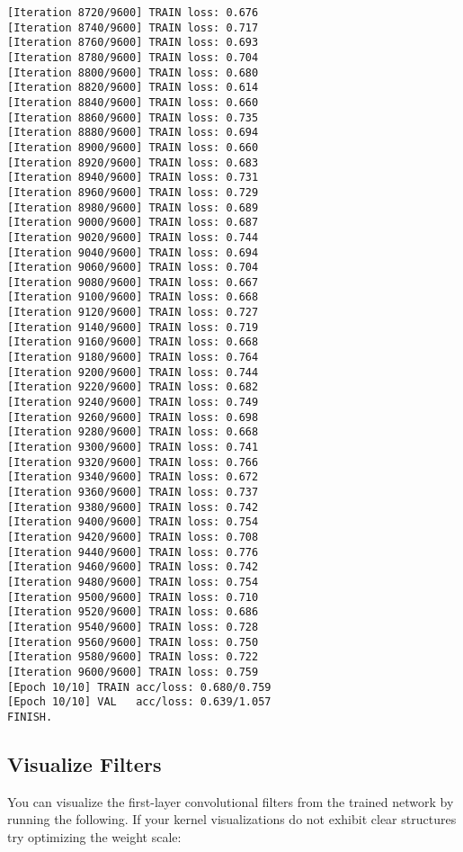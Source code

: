 \documentclass[11pt]{article}
\begin{document}
\begin{Verbatim}[commandchars=\\\{\}]
[Iteration 8720/9600] TRAIN loss: 0.676
[Iteration 8740/9600] TRAIN loss: 0.717
[Iteration 8760/9600] TRAIN loss: 0.693
[Iteration 8780/9600] TRAIN loss: 0.704
[Iteration 8800/9600] TRAIN loss: 0.680
[Iteration 8820/9600] TRAIN loss: 0.614
[Iteration 8840/9600] TRAIN loss: 0.660
[Iteration 8860/9600] TRAIN loss: 0.735
[Iteration 8880/9600] TRAIN loss: 0.694
[Iteration 8900/9600] TRAIN loss: 0.660
[Iteration 8920/9600] TRAIN loss: 0.683
[Iteration 8940/9600] TRAIN loss: 0.731
[Iteration 8960/9600] TRAIN loss: 0.729
[Iteration 8980/9600] TRAIN loss: 0.689
[Iteration 9000/9600] TRAIN loss: 0.687
[Iteration 9020/9600] TRAIN loss: 0.744
[Iteration 9040/9600] TRAIN loss: 0.694
[Iteration 9060/9600] TRAIN loss: 0.704
[Iteration 9080/9600] TRAIN loss: 0.667
[Iteration 9100/9600] TRAIN loss: 0.668
[Iteration 9120/9600] TRAIN loss: 0.727
[Iteration 9140/9600] TRAIN loss: 0.719
[Iteration 9160/9600] TRAIN loss: 0.668
[Iteration 9180/9600] TRAIN loss: 0.764
[Iteration 9200/9600] TRAIN loss: 0.744
[Iteration 9220/9600] TRAIN loss: 0.682
[Iteration 9240/9600] TRAIN loss: 0.749
[Iteration 9260/9600] TRAIN loss: 0.698
[Iteration 9280/9600] TRAIN loss: 0.668
[Iteration 9300/9600] TRAIN loss: 0.741
[Iteration 9320/9600] TRAIN loss: 0.766
[Iteration 9340/9600] TRAIN loss: 0.672
[Iteration 9360/9600] TRAIN loss: 0.737
[Iteration 9380/9600] TRAIN loss: 0.742
[Iteration 9400/9600] TRAIN loss: 0.754
[Iteration 9420/9600] TRAIN loss: 0.708
[Iteration 9440/9600] TRAIN loss: 0.776
[Iteration 9460/9600] TRAIN loss: 0.742
[Iteration 9480/9600] TRAIN loss: 0.754
[Iteration 9500/9600] TRAIN loss: 0.710
[Iteration 9520/9600] TRAIN loss: 0.686
[Iteration 9540/9600] TRAIN loss: 0.728
[Iteration 9560/9600] TRAIN loss: 0.750
[Iteration 9580/9600] TRAIN loss: 0.722
[Iteration 9600/9600] TRAIN loss: 0.759
[Epoch 10/10] TRAIN acc/loss: 0.680/0.759
[Epoch 10/10] VAL   acc/loss: 0.639/1.057
FINISH.

    \end{Verbatim}

    \subsection{Visualize Filters}\label{visualize-filters}

You can visualize the first-layer convolutional filters from the trained
network by running the following. If your kernel visualizations do not
exhibit clear structures try optimizing the weight scale:
\end{document}
